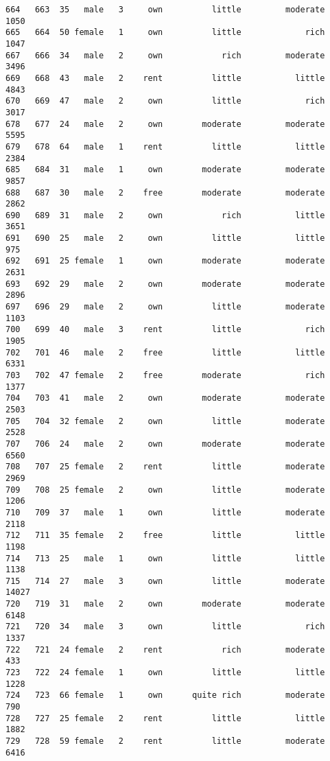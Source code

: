 \documentclass[
]{article}
\begin{document}
\begin{verbatim}
664   663  35   male   3     own          little         moderate          1050
665   664  50 female   1     own          little             rich          1047
667   666  34   male   2     own            rich         moderate          3496
669   668  43   male   2    rent          little           little          4843
670   669  47   male   2     own          little             rich          3017
678   677  24   male   2     own        moderate         moderate          5595
679   678  64   male   1    rent          little           little          2384
685   684  31   male   1     own        moderate         moderate          9857
688   687  30   male   2    free        moderate         moderate          2862
690   689  31   male   2     own            rich           little          3651
691   690  25   male   2     own          little           little           975
692   691  25 female   1     own        moderate         moderate          2631
693   692  29   male   2     own        moderate         moderate          2896
697   696  29   male   2     own          little         moderate          1103
700   699  40   male   3    rent          little             rich          1905
702   701  46   male   2    free          little           little          6331
703   702  47 female   2    free        moderate             rich          1377
704   703  41   male   2     own        moderate         moderate          2503
705   704  32 female   2     own          little         moderate          2528
707   706  24   male   2     own        moderate         moderate          6560
708   707  25 female   2    rent          little         moderate          2969
709   708  25 female   2     own          little         moderate          1206
710   709  37   male   1     own          little         moderate          2118
712   711  35 female   2    free          little           little          1198
714   713  25   male   1     own          little           little          1138
715   714  27   male   3     own          little         moderate         14027
720   719  31   male   2     own        moderate         moderate          6148
721   720  34   male   3     own          little             rich          1337
722   721  24 female   2    rent            rich         moderate           433
723   722  24 female   1     own          little           little          1228
724   723  66 female   1     own      quite rich         moderate           790
728   727  25 female   2    rent          little           little          1882
729   728  59 female   2    rent          little         moderate          6416

\end{verbatim}
\end{document}
